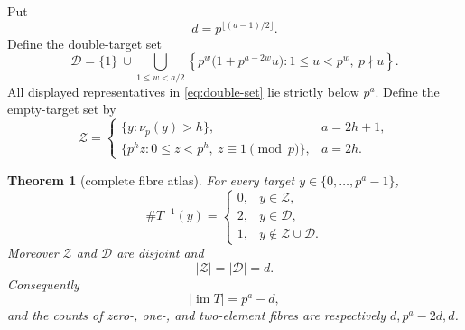 \documentclass[a4paper,10pt]{amsart}
\newtheorem{theorem}{Theorem}[section]
\theoremstyle{remark}
\newcommand{\vp}{\nu_p}
\newcommand{\im}{\operatorname{im}}
\begin{document}
Put
\begin{equation}\label{eq:defect}
 d=p^{\lfloor(a-1)/2\rfloor}.
\end{equation}
Define the double-target set
\begin{equation}\label{eq:double-set}
 \mathcal D=\{1\}\ \cup\!
 \bigcup_{1\leq w<a/2}
 \left\{p^w\bigl(1+p^{a-2w}u\bigr):
       1\leq u<p^w,\ p\nmid u\right\}.
\end{equation}
All displayed representatives in \eqref{eq:double-set} lie strictly below
$p^a$.  Define the empty-target set by
\begin{equation}\label{eq:empty-set}
 \mathcal Z=
 \begin{cases}
 \{y:\vp(y)>h\},&a=2h+1,\\
 \{p^hz:0\leq z<p^h,\ z\equiv1\pmod p\},&a=2h.
 \end{cases}
\end{equation}

\begin{theorem}[complete fibre atlas]\label{thm:fibres}
For every target $y\in\{0,\ldots,p^a-1\}$,
\begin{equation}\label{eq:fibre-size}
 \#T^{-1}(y)=
 \begin{cases}
 0,&y\in\mathcal Z,\\
 2,&y\in\mathcal D,\\
 1,&y\notin\mathcal Z\cup\mathcal D.
 \end{cases}
\end{equation}
Moreover $\mathcal Z$ and $\mathcal D$ are disjoint and
\begin{equation}\label{eq:fibre-census}
 |\mathcal Z|=|\mathcal D|=d.
\end{equation}
Consequently
\begin{equation}\label{eq:image}
 |\im T|=p^a-d,
\end{equation}
and the counts of zero-, one-, and two-element fibres are respectively
$d,p^a-2d,d$.
\end{theorem}
\end{document}
